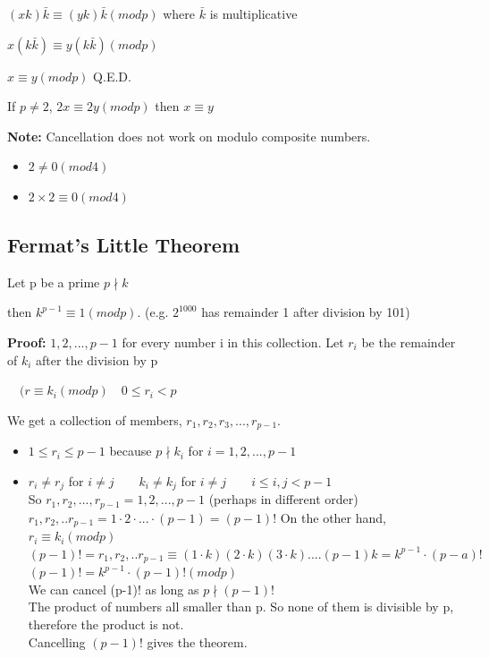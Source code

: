 \documentclass[9pt, letterpaper, oneside]{article}
\begin{document}
$(xk)\bar{k} \equiv (yk)\bar{k} (mod p)$ where $\bar{k}$ is multiplicative

$x(k\bar{k}) \equiv y(k\bar{k}) (mod p)$

$x \equiv y (mod p)$ Q.E.D.

If $p \neq 2$, $2x \equiv 2y (mod p)$ then $x \equiv y$

\textbf{Note:} Cancellation does not work on modulo composite numbers.\\
\begin{itemize}
    \item $2 \neq 0 (mod 4)$\\
    \item $2 \times 2 \equiv 0 (mod 4)$
\end{itemize}

\subsection{Fermat's Little Theorem}

Let p be a prime $p \nmid k$

\quad then $k^{p-1} \equiv 1 (mod p)$.
(e.g. $2^{1000}$ has remainder 1 after division by 101)

\textbf{Proof:} $1,2,..., p-1$ for every number i in this collection. Let $r_i$ be the remainder of $k_i$ after the division by p 

$\quad (r \equiv k_i (mod p) \quad 0 \leq r_i < p$

We get a collection of members, $r_1, r_2, r_3, ... , r_{p-1}$.

\begin{itemize}
    \item $1 \leq r_i \leq p -1$ because $p \nmid k_i$ for $i = 1,2,...,p-1$
    \item $r_i \neq r_j$ for $i \neq j \qquad k_i \neq k_j$ for $i \neq j \qquad i \leq i,j < p -1$\\
        So $r_1, r_2, ..., r_{p-1} = {1, 2, ..., p-1}$ (perhaps in different order)\\
        $r_1, r_2, .. r_{p -1} = 1 \cdot 2 \cdot ... \cdot (p-1) = (p-1)!$
        On the other hand, $r_i \equiv k_i (mod p)$\\
        $(p-1)! = r_1, r_2, .. r_{p -1} \equiv (1 \cdot k) (2 \cdot k)(3 \cdot k) .... (p-1) k = k^{p-1} \cdot (p-a)!$\\
        $(p-1)! = k^{p-1} \cdot (p-1)! (mod p)$\\
        We can cancel (p-1)! as long as $p \nmid (p-1)!$\\
        The product of numbers all smaller than p. So none of them is divisible by p, therefore the product is not.\\
        Cancelling $(p-1)!$ gives the theorem.
\end{itemize}
\end{document}
